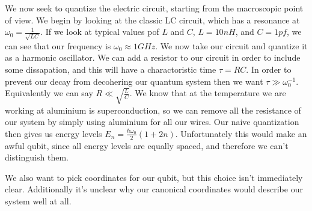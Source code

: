 We now seek to quantize the electric circuit, starting from the macroscopic point of view. We begin by looking at the classic LC circuit, which has a resonance at $\omega_0 = \frac{1}{\sqrt{LC}}$.
If we look at typical values pof $L$ and $C$, $L=10nH$, and $C=1pf$, we can see that our frequency is $\omega_0 \approx 1 GHz$. We now take our circuit and quantize it as a harmonic oscillator.
We can add a resistor to our circuit in order to include some dissapation, and this will have a charactoristic time $\tau = RC$. In order to prevent our decay from decohering our quantum system then we want $\tau \gg \omega_0^{-1}$.
Equivalently we can say $R \ll \sqrt{\frac{L}{C}}$. We know that at the temperature we are working at aluminium is superconduction, so we can remove all the resistance of our system by simply using aluminium for all our wires.
Our naive quantization then gives us energy levels $E_n = \frac{\hbar\omega_0}{2}(1+2n)$. Unfortunately this would make an awful qubit, since all energy levels are equally spaced, and therefore we can't distinguish them.

We also want to pick coordinates for our qubit, but this choice isn't immediately clear. Additionally it's unclear why our canonical coordinates would describe our system well at all.
